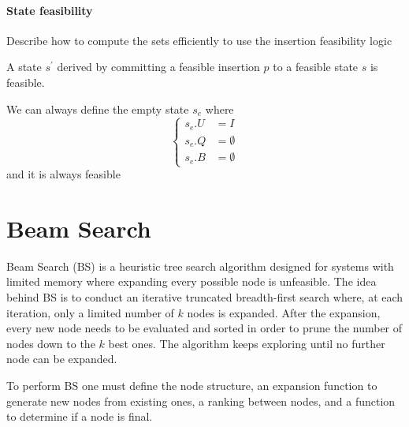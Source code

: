 \paragraph*{State feasibility}
Describe how to compute the sets efficiently to use the insertion feasibility logic\\


\begin{proposition}
    \label{prop:feasible_expansion}
    A state $s^\prime$ derived by committing a feasible insertion $p$ to a feasible state $s$ is feasible.
\end{proposition}

\begin{observation}
    \label{def:empty_state}
    We can always define the empty state $s_e$ where \begin{equation*}
        \left\{ 
            \begin{aligned}
            s_e.U & = I \\
            s_e.Q & = \emptyset \\
            s_e.B & = \emptyset
            \end{aligned}
        \right.
    \end{equation*}
    and it is always feasible
\end{observation}

\section{Beam Search}
\label{sec:beamsearch}%
Beam Search (BS) %
is a heuristic tree search algorithm designed for systems with limited memory where expanding every possible node is unfeasible.
The idea behind BS is to conduct an iterative truncated breadth-first search where, at each iteration, only a limited number of $k$ nodes is expanded.
After the expansion, every new node needs to be evaluated and sorted in order to prune the number of nodes down to the $k$ best ones. The algorithm keeps exploring until no further node can be expanded.

To perform BS one must define the node structure, an expansion function to generate new nodes from existing ones, a ranking between nodes, and a function to determine if a node is final.

